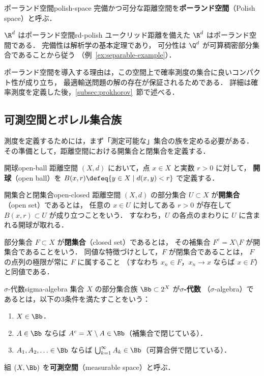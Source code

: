\begin{definition}{ポーランド空間}{polish-space}
  完備かつ可分な距離空間を\textbf{ポーランド空間}（Polish space）と呼ぶ．
\end{definition}

\begin{example}{$\R^d$ はポーランド空間}{rd-polish}
  ユークリッド距離を備えた $\R^d$ はポーランド空間である．
  完備性は解析学の基本定理であり，
  可分性は $\Q^d$ が可算稠密部分集合であることから従う
  （例~\ref{ex:separable-example}）．
\end{example}

ポーランド空間を導入する理由は，この空間上で確率測度の集合に良いコンパクト性が成り立ち，
最適輸送問題の解の存在が保証されるためである．
詳細は確率測度を定義した後，\ref{subsec:prokhorov}~節で述べる．

\subsection{可測空間とボレル集合族}
\label{subsec:measurable-space}

測度を定義するためには，まず「測定可能な」集合の族を定める必要がある．
その準備として，距離空間における開集合と閉集合を定義する．

\begin{definition}{開球}{open-ball}
  距離空間 $(X, d)$ において，点 $x \in X$ と実数 $r > 0$ に対して，
  \textbf{開球}（open ball）を
  $B(x, r) \defeq \{y \in X \mid d(x, y) < r\}$
  で定義する．
\end{definition}

\begin{definition}{開集合と閉集合}{open-closed}
  距離空間 $(X, d)$ の部分集合 $U \subset X$ が\textbf{開集合}（open set）であるとは，
  任意の $x \in U$ に対してある $r > 0$ が存在して
  $B(x, r) \subset U$ が成り立つことをいう．
  すなわち，$U$ の各点のまわりに $U$ に含まれる開球が取れる．

  部分集合 $F \subset X$ が\textbf{閉集合}（closed set）であるとは，
  その補集合 $F^c = X \setminus F$ が開集合であることをいう．
  同値な特徴づけとして，$F$ が閉集合であることは，
  $F$ の点列の極限が常に $F$ に属すること
  （すなわち $x_n \in F$，$x_n \to x$ ならば $x \in F$）と同値である．
\end{definition}

\begin{definition}{$\sigma$-代数}{sigma-algebra}
  集合 $X$ の部分集合族 $\Bb \subset 2^X$ が\textbf{$\sigma$-代数}
  （$\sigma$-algebra）であるとは，以下の3条件を満たすことをいう：
  \begin{enumerate}
    \item $X \in \Bb$．
    \item $A \in \Bb$ ならば $A^c = X \setminus A \in \Bb$（補集合で閉じている）．
    \item $A_1, A_2, \ldots \in \Bb$ ならば
      $\bigcup_{k=1}^{\infty} A_k \in \Bb$（可算合併で閉じている）．
  \end{enumerate}
  組 $(X, \Bb)$ を\textbf{可測空間}（measurable space）と呼ぶ．
\end{definition}

